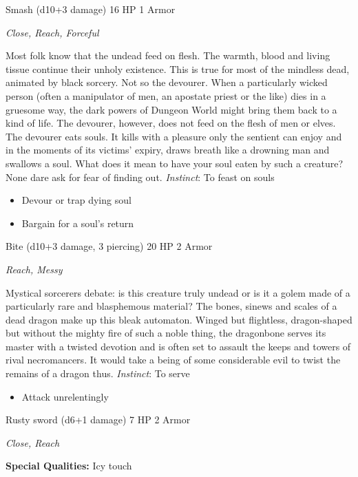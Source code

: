 Smash (d10+3 damage)\hspace*{\fill} 16 HP 1 Armor

\emph{Close, Reach, Forceful}

\HRule
Most folk know that the undead feed on flesh. The warmth, blood and living tissue continue their unholy existence. This is true for most of the mindless dead, animated by black sorcery. Not so the devourer. When a particularly wicked person (often a manipulator of men, an apostate priest or the like) dies in a gruesome way, the dark powers of Dungeon World might bring them back to a kind of life. The devourer, however, does not feed on the flesh of men or elves. The devourer eats souls. It kills with a pleasure only the sentient can enjoy and in the moments of its victims' expiry, draws breath like a drowning man and swallows a soul. What does it mean to have your soul eaten by such a creature? None dare ask for fear of finding out. \emph{Instinct}: To feast on souls
\begin{itemize}
\item Devour or trap dying soul
\item Bargain for a soul's return
\end{itemize}

\HRule
{}

Bite (d10+3 damage, 3 piercing)\hspace*{\fill} 20 HP 2 Armor

\emph{Reach, Messy}

\HRule
Mystical sorcerers debate: is this creature truly undead or is it a golem made of a particularly rare and blasphemous material? The bones, sinews and scales of a dead dragon make up this bleak automaton. Winged but flightless, dragon-shaped but without the mighty fire of such a noble thing, the dragonbone serves its master with a twisted devotion and is often set to assault the keeps and towers of rival necromancers. It would take a being of some considerable evil to twist the remains of a dragon thus. \emph{Instinct}: To serve
\begin{itemize}
\item Attack unrelentingly
\end{itemize}
\newpage
\HRule
{}

Rusty sword (d6+1 damage)\hspace*{\fill} 7 HP 2 Armor

\emph{Close, Reach}

\textbf{Special Qualities:}
Icy touch

